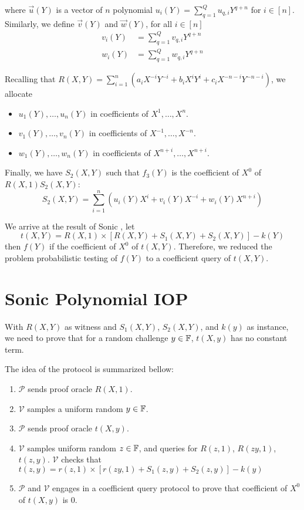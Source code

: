where $\Vec{u}(Y)$ is a vector of $n$ polynomial $u_i(Y) = \sum_{q=1}^Q u_{q, i} Y^{q+n}$ for $i \in [n]$. Similarly, we define $\Vec{v}(Y)$ and $\Vec{w}(Y)$, for all $i \in [n]$
\begin{align*}
v_i(Y) & = \sum_{q=1}^Q v_{q, i} Y^{q+n} \\
w_i(Y) & = \sum_{q=1}^Q w_{q, i} Y^{q+n}    
\end{align*}

Recalling that $R(X, Y) = \sum_{i=1}^n \left(a_i X^{-i} Y^{-i} + b_i X^{i} Y^{i} + c_i X^{-n-i} Y^{-n-i}\right)$, we allocate
\begin{itemize}
    \item $u_1(Y),\dots,u_n(Y)$ in coefficients of $X^1,\dots,X^n$.
    \item $v_1(Y),\dots,v_n(Y)$ in coefficients of $X^{-1},\dots,X^{-n}$.
    \item $w_1(Y),\dots,w_n(Y)$ in coefficients of $X^{n+i},\dots,X^{n+i}$.
\end{itemize}

Finally, we have $S_2(X, Y)$ such that $f_3(Y)$ is the coefficient of $X^0$ of $R(X, 1) S_2(X, Y)$:
$$S_2(X, Y) = \sum_{i=1}^{n} \left( u_i(Y)X^i + v_i(Y)X^{-i} + w_i(Y)X^{n+i} \right)$$

We arrive at the result of Sonic \cite{maller2019sonic}, let
$$t(X, Y) = R(X, 1) \times \left[ R(X, Y) + S_1(X, Y) + S_2(X, Y) \right] - k(Y)$$
then $f(Y)$ if the coefficient of $X^0$ of $t(X, Y)$. Therefore, we reduced the problem probabilistic testing of $f(Y)$ to a coefficient query of $t(X, Y)$.

\section{Sonic Polynomial IOP}

With $R(X, Y)$ as witness and $S_1(X, Y)$, $S_2(X, Y)$, and $k(y)$ as instance, we need to prove that for a random challenge $y \in \mathbb{F}$, $t(X, y)$ has no constant term.

The idea of the protocol is summarized bellow:
\begin{enumerate}
    \item $\mathcal{P}$ sends proof oracle $R(X, 1)$.
    \item $\mathcal{V}$ samples a uniform random $y \in \mathbb{F}$.
    \item $\mathcal{P}$ sends proof oracle $t(X, y)$.
    \item $\mathcal{V}$ samples uniform random $z \in \mathbb{F}$, and queries for $R(z, 1)$, $R(zy, 1)$, $t(z, y)$. $\mathcal{V}$ checks that $t(z, y) = r(z,1) \times \left[ r(zy, 1) + S_1(z, y) + S_2(z, y)\right] - k(y)$
    \item $\mathcal{P}$ and $\mathcal{V}$ engages in a coefficient query protocol to prove that coefficient of $X^0$ of $t(X, y)$ is 0.
\end{enumerate}

